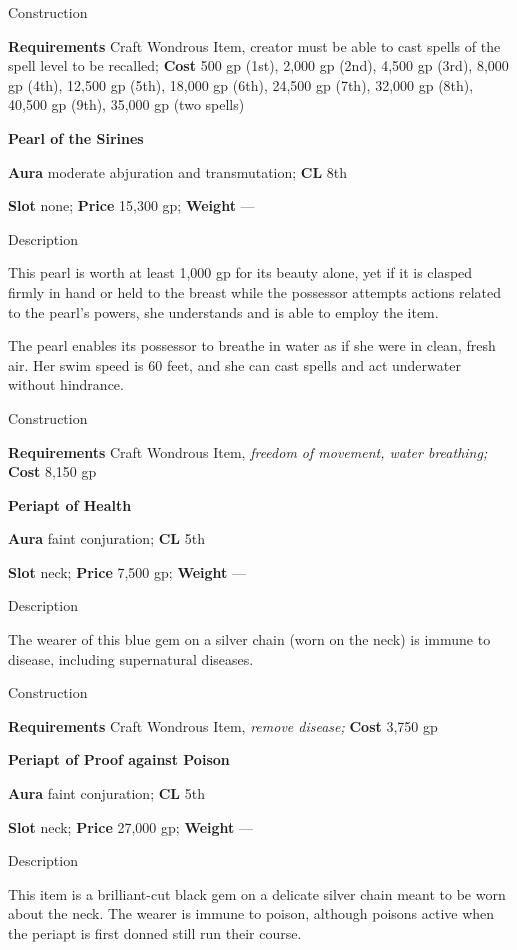 Construction
				
\textbf{Requirements} Craft Wondrous Item, creator must be able to cast spells of the spell level to be recalled;\textbf{ Cost }500 gp (1st), 2,000 gp (2nd), 4,500 gp (3rd), 8,000 gp (4th), 12,500 gp (5th), 18,000 gp (6th), 24,500 gp (7th), 32,000 gp (8th), 40,500 gp (9th), 35,000 gp (two spells)
				
\textbf{Pearl of the Sirines}
				
\textbf{Aura} moderate abjuration and transmutation;\textbf{ CL }8th
				
\textbf{Slot} none; \textbf{Price} 15,300 gp; \textbf{Weight }---
				
Description
				
This pearl is worth at least 1,000 gp for its beauty alone, yet if it is clasped firmly in hand or held to the breast while the possessor attempts actions related to the pearl's powers, she understands and is able to employ the item.
				
The pearl enables its possessor to breathe in water as if she were in clean, fresh air. Her swim speed is 60 feet, and she can cast spells and act underwater without hindrance. 
				
Construction
				
\textbf{Requirements} Craft Wondrous Item,\textit{ freedom of movement, water breathing;}\textbf{ Cost }8,150 gp
				
\textbf{Periapt of Health}
				
\textbf{Aura} faint conjuration;\textbf{ CL }5th
				
\textbf{Slot} neck; \textbf{Price} 7,500 gp; \textbf{Weight }---
				
Description
				
The wearer of this blue gem on a silver chain (worn on the neck) is immune to disease, including supernatural diseases. 
				
Construction
				
\textbf{Requirements} Craft Wondrous Item,\textit{ remove disease;}\textbf{ Cost }3,750 gp
				
\textbf{Periapt of Proof against Poison}
				
\textbf{Aura} faint conjuration;\textbf{ CL }5th
				
\textbf{Slot} neck; \textbf{Price} 27,000 gp; \textbf{Weight }---
				
Description
				
This item is a brilliant-cut black gem on a delicate silver chain meant to be worn about the neck. The wearer is immune to poison, although poisons active when the periapt is first donned still run their course. 
				
